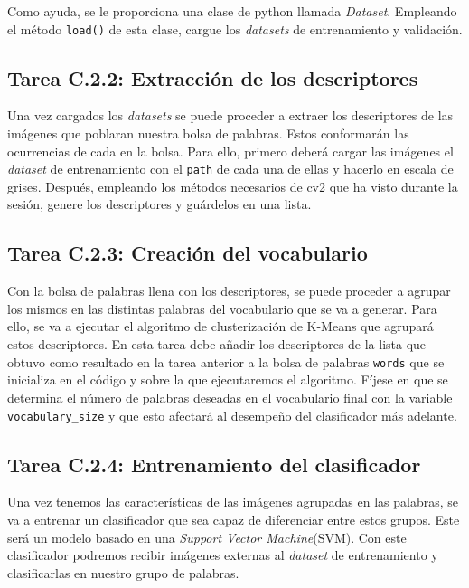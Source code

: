 Como ayuda, se le proporciona una clase de python llamada \textit{Dataset}. Empleando el método \texttt{load()} de esta clase, cargue los \textit{datasets} de entrenamiento y validación.

\subsection*{Tarea C.2.2: Extracción de los descriptores}

Una vez cargados los \textit{datasets} se puede proceder a extraer los descriptores de las imágenes que poblaran nuestra bolsa de palabras. Estos conformarán las ocurrencias de cada en la bolsa. Para ello, primero deberá cargar las imágenes el \textit{dataset} de entrenamiento con el \texttt{path} de cada una de ellas y hacerlo en escala de grises. Después, empleando los métodos necesarios de cv2 que ha visto durante la sesión, genere los descriptores y guárdelos en una lista.

\subsection*{Tarea C.2.3: Creación del vocabulario}

Con la bolsa de palabras llena con los descriptores, se puede proceder a agrupar los mismos en las distintas palabras del vocabulario que se va a generar. Para ello, se va a ejecutar el algoritmo de clusterización de K-Means que agrupará estos descriptores. En esta tarea debe añadir los descriptores de la lista que obtuvo como resultado en la tarea anterior a la bolsa de palabras \texttt{words} que se inicializa en el código y sobre la que ejecutaremos el algoritmo. Fíjese en que se determina el número de palabras deseadas en el vocabulario final con la variable \texttt{vocabulary\_size} y que esto afectará al desempeño del clasificador más adelante.

\subsection*{Tarea C.2.4: Entrenamiento del clasificador}

Una vez tenemos las características de las imágenes agrupadas en las palabras, se va a entrenar un clasificador que sea capaz de diferenciar entre estos grupos. Este será un modelo basado en una  \textit{Support Vector Machine}(SVM). Con este clasificador podremos recibir imágenes externas al \textit{dataset} de entrenamiento y clasificarlas en nuestro grupo de palabras.

